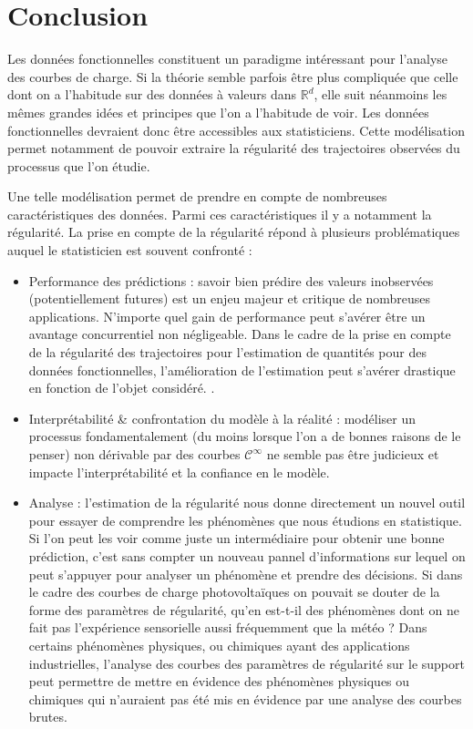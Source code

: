 \chapter{Conclusion}

Les données fonctionnelles constituent un paradigme intéressant pour l'analyse des courbes de charge. Si la théorie semble parfois être plus compliquée que celle dont on a l'habitude sur des données à valeurs dans $\mathds R^d$, elle suit néanmoins les mêmes grandes idées et principes que l'on a l'habitude de voir. Les données fonctionnelles devraient donc être accessibles aux statisticiens. Cette modélisation permet notamment de pouvoir extraire la régularité des trajectoires observées du processus que l'on étudie. 

\bigskip

Une telle modélisation permet de prendre en compte de nombreuses caractéristiques des données. Parmi ces caractéristiques il y a notamment la régularité. La prise en compte de la régularité répond à plusieurs problématiques auquel le statisticien est souvent confronté : 

\begin{itemize}
	\item Performance des prédictions : savoir bien prédire des valeurs inobservées (potentiellement futures) est un enjeu majeur et critique de nombreuses applications. N'importe quel gain de performance peut s'avérer être un avantage concurrentiel non négligeable. Dans le cadre de la prise en compte de la régularité des trajectoires pour l'estimation de quantités pour des données fonctionnelles, l'amélioration de l'estimation peut s'avérer drastique en fonction de l'objet considéré. .
	\item Interprétabilité \& confrontation du modèle à la réalité : modéliser un processus fondamentalement (du moins lorsque l'on a de bonnes raisons de le penser) non dérivable par des courbes $\mathcal C^\infty$ ne semble pas être judicieux et impacte l'interprétabilité et la confiance en le modèle.
	\item Analyse : l'estimation de la régularité nous donne directement un nouvel outil pour essayer de comprendre les phénomènes que nous étudions en statistique. Si l'on peut les voir comme juste un intermédiaire pour obtenir une bonne prédiction, c'est sans compter un nouveau pannel d'informations sur lequel on peut s'appuyer pour analyser un phénomène et prendre des décisions. Si dans le cadre des courbes de charge photovoltaïques on pouvait se douter de la forme des paramètres de régularité, qu'en est-t-il des phénomènes dont on ne fait pas l'expérience sensorielle aussi fréquemment que la météo ? Dans certains phénomènes physiques, ou chimiques ayant des applications industrielles, l'analyse des courbes des paramètres de régularité sur le support peut permettre de mettre en évidence des phénomènes physiques ou chimiques qui n'auraient pas été mis en évidence par une analyse des courbes brutes.
\end{itemize}

